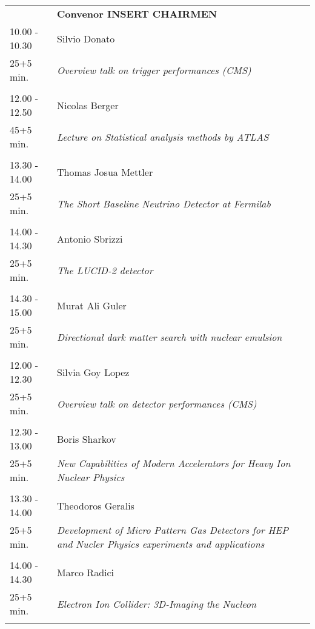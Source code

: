 \begin{longtable}{p{3cm}p{13cm}}
&\hfill {\bf Convenor INSERT CHAIRMEN }\\ 
10.00 - 10.30 & Silvio Donato\\ 
25+5 min. & {\it Overview talk on trigger performances (CMS)}\\ 
 & \\ 
12.00 - 12.50 & Nicolas Berger\\ 
45+5 min. & {\it Lecture on Statistical analysis methods by ATLAS}\\ 
 & \\ 
13.30 - 14.00 & Thomas Josua Mettler\\ 
25+5 min. & {\it The Short Baseline Neutrino Detector at Fermilab}\\ 
 & \\ 
14.00 - 14.30 & Antonio Sbrizzi\\ 
25+5 min. & {\it The LUCID-2 detector}\\ 
 & \\ 
14.30 - 15.00 & Murat Ali Guler\\ 
25+5 min. & {\it Directional dark matter search with nuclear emulsion}\\ 
 & \\ 
12.00 - 12.30 & Silvia Goy Lopez\\ 
25+5 min. & {\it Overview talk on detector performances (CMS)}\\ 
 & \\ 
12.30 - 13.00 & Boris Sharkov\\ 
25+5 min. & {\it New Capabilities of Modern Accelerators for Heavy Ion  Nuclear Physics}\\ 
 & \\ 
13.30 - 14.00 & Theodoros Geralis\\ 
25+5 min. & {\it Development of Micro Pattern Gas Detectors for HEP and Nucler Physics experiments and applications}\\ 
 & \\ 
14.00 - 14.30 & Marco Radici\\ 
25+5 min. & {\it Electron Ion Collider: 3D-Imaging the Nucleon}\\ 
 & \\ 
\end{longtable}


